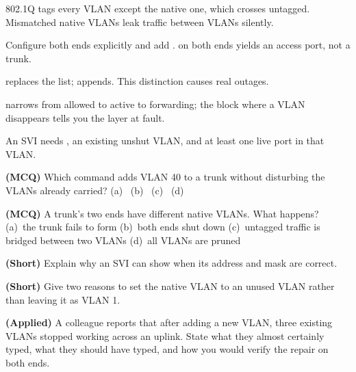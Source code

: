\begin{chaptersummary}
\begin{tight}
  \item 802.1Q tags every VLAN except the native one, which crosses untagged.
        Mismatched native VLANs leak traffic between VLANs silently.
  \item Configure both ends explicitly and add .
         on both ends yields an access port, not a trunk.
  \item {} replaces the list;  appends.
        This distinction causes real outages.
  \item {} narrows from allowed to active to forwarding;
        the block where a VLAN disappears tells you the layer at fault.
  \item An SVI needs , an existing unshut VLAN, and at least one
        live port in that VLAN.
\end{tight}
\end{chaptersummary}

\begin{reviewq}
  \item \textbf{(MCQ)} Which command adds VLAN 40 to a trunk without disturbing
        the VLANs already carried?
        (a)~
        (b)~
        (c)~
        (d)~
  \item \textbf{(MCQ)} A trunk's two ends have different native VLANs. What
        happens? (a)~the trunk fails to form (b)~both ends shut down (c)~untagged
        traffic is bridged between two VLANs (d)~all VLANs are pruned
  \item \textbf{(Short)} Explain why an SVI can show  when its
        address and mask are correct.
  \item \textbf{(Short)} Give two reasons to set the native VLAN to an unused
        VLAN rather than leaving it as VLAN 1.
  \item \textbf{(Applied)} A colleague reports that after adding a new VLAN,
        three existing VLANs stopped working across an uplink. State what they
        almost certainly typed, what they should have typed, and how you would
        verify the repair on both ends.
\end{reviewq}
